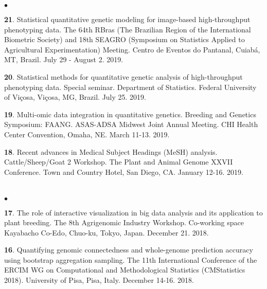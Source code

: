 \documentclass[margin,line,10pt]{res}
\newenvironment{list2}{
  \begin{list}{$\bullet$}{%
      \setlength{\itemsep}{0in}
      \setlength{\parsep}{0in} \setlength{\parskip}{0in}
      \setlength{\topsep}{0in} \setlength{\partopsep}{0in} 
      \setlength{\leftmargin}{0.2in}}}{\end{list}}
\begin{document}
\begin{resume}
\begin{list2}
 \item [{\bf 21}.] Statistical quantitative genetic modeling for image-based high-throughput phenotyping data. The 64th RBras (The Brazilian  Region  of the International Biometric Society) and 18th SEAGRO (Symposium on Statistics Applied to Agricultural Experimentation) Meeting. Centro de Eventos do Pantanal, Cuiab{\'a}, MT, Brazil. July 29 - August 2. 2019. 

   \vspace{0.5cm}

   
 \item [{\bf 20}.]      
     Statistical methods for quantitative genetic analysis of high-throughput phenotyping data. Special seminar. Department of Statistics. Federal University of Vi\c cosa, Vi\c cosa, MG, Brazil. July 25. 2019. 
   
    
   \vspace{0.5cm}
   
   \item [{\bf 19}.]  Multi-omic data integration in quantitative genetics. Breeding and Genetics Symposium: FAANG. ASAS-ADSA Midwest Joint Annual Meeting. CHI Health Center Convention, Omaha, NE. March 11-13. 2019. 

  \vspace{0.5cm}

 \item [{\bf 18}.] Recent advances in Medical Subject Headings (MeSH) analysis. Cattle/Sheep/Goat 2 Workshop. The Plant and Animal Genome XXVII Conference. Town and Country Hotel, San Diego, CA. January 12-16. 2019. 

\end{list2}

  
  
\section{}
\begin{list2}

  \item [{\bf 17}.] The role of interactive visualization in big data analysis and its application to plant breeding. The 8th Agrigenomic Industry Workshop. Co-working space Kayabacho Co-Edo, Chuo-ku, Tokyo, Japan. December 21. 2018. 

    \vspace{0.5cm}
    
   \item [{\bf 16}.] Quantifying genomic connectedness and whole-genome prediction accuracy using bootstrap aggregation sampling. The 11th International Conference of the ERCIM WG on Computational and Methodological Statistics (CMStatistics 2018). University of Pisa, Pisa, Italy. December 14-16. 2018. 


\end{list2}
\end{resume}
\end{document}
